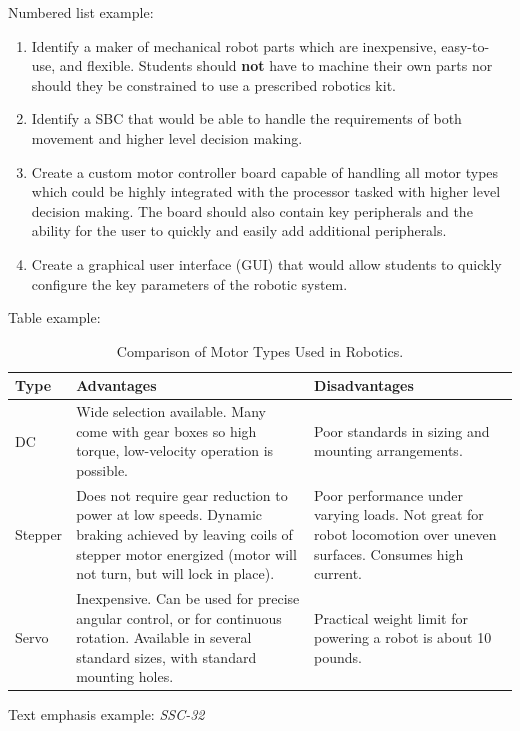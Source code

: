 \documentclass[12pt,oneside,final]{siuethesis}
\theoremstyle{definition}
\begin{document}
\noindent
Numbered list example: 
\begin{enumerate}
\item
Identify a maker of mechanical robot parts which are inexpensive, easy-to-use, and flexible. Students should \textbf{not} have to machine their own parts nor should they be constrained to use a prescribed robotics kit.
\item
Identify a SBC that would be able to handle the requirements of both movement and higher level decision making.
\item
Create a custom motor controller board capable of handling all motor types which could be highly integrated with the processor tasked with higher level decision making. The board should also contain key peripherals and the ability for the user to quickly and easily add additional peripherals.
\item
Create a graphical user interface (GUI) that would allow students to quickly configure the key parameters of the robotic system.
\end{enumerate}

Table example: 

\begin{table}[htbp!]
\begin{center}
\begin{tabular}{|p{0.75in}|p{2.5in}|p{2.5in}|}
\hline
Type & 
Advantages & 
Disadvantages\\
\hline
DC & 
Wide selection available. Many come with gear boxes so high torque, low-velocity operation is possible. & 
Poor standards in sizing and mounting arrangements.\\
\hline
Stepper & 
Does not require gear reduction to power at low speeds. Dynamic braking achieved by leaving coils of stepper motor energized (motor will not turn, but will lock in place).& 
Poor performance under varying loads. Not great for robot locomotion over uneven surfaces. Consumes high current.\\
\hline
Servo & 
Inexpensive. Can be used for precise angular control, or for continuous rotation. Available in several standard sizes, with standard mounting holes. & 
Practical weight limit for powering a robot is about 10 pounds.\\
\hline
\end{tabular}
\caption{Comparison of Motor Types Used in Robotics.}
\label{Tab:Motor_Types}
\end{center}
\end{table}

Text emphasis example: \emph{SSC-32}
\end{document}

